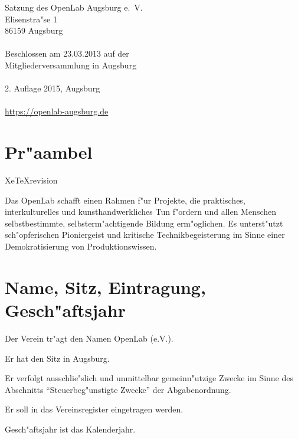 \documentclass[a5paper, ngerman, 10pt]{scrreprt}
\begin{document}


\thispagestyle{empty}
\vspace*{\fill}
\begin{footnotesize}
    \begin{singlespace}
        \noindent Satzung des OpenLab Augsburg e.~V.\\
        Elisenstra"se 1\\
        86159 Augsburg\\
        \\
        Beschlossen am 23.03.2013 auf der\\
        Mitgliederversammlung in Augsburg\\
        \\
        2. Auflage 2015, Augsburg\\
        \\
        \url{https://openlab-augsburg.de}
    \end{singlespace}
\end{footnotesize}
\clearpage

\tableofcontents
\clearpage


\section*{Pr"aambel}
\ifx\csname XeTeXrevision\endcsname
\fi
Das OpenLab schafft einen Rahmen f"ur Projekte, die praktisches,
interkulturelles und kunsthandwerkliches Tun f"ordern und allen Menschen
selbstbestimmte, selbsterm"achtigende Bildung erm"oglichen. Es unterst"utzt
sch"opferischen Pioniergeist und kritische Technikbegeisterung im Sinne einer
Demokratisierung von Produktionswissen.


\section{Name, Sitz, Eintragung, Gesch"aftsjahr}
\begin{compactenum}[(1)]
    \item Der Verein tr"agt den Namen OpenLab (e.V.).
    \item Er hat den Sitz in Augsburg.
    \item Er verfolgt ausschlie"slich und unmittelbar gemeinn"utzige Zwecke im
        Sinne des Abschnitts "`Steuerbeg"unstigte Zwecke"' der Abgabenordnung.
    \item Er soll in das Vereinsregister eingetragen werden.
    \item Gesch"aftsjahr ist das Kalenderjahr.
\end{compactenum}
\end{document}
